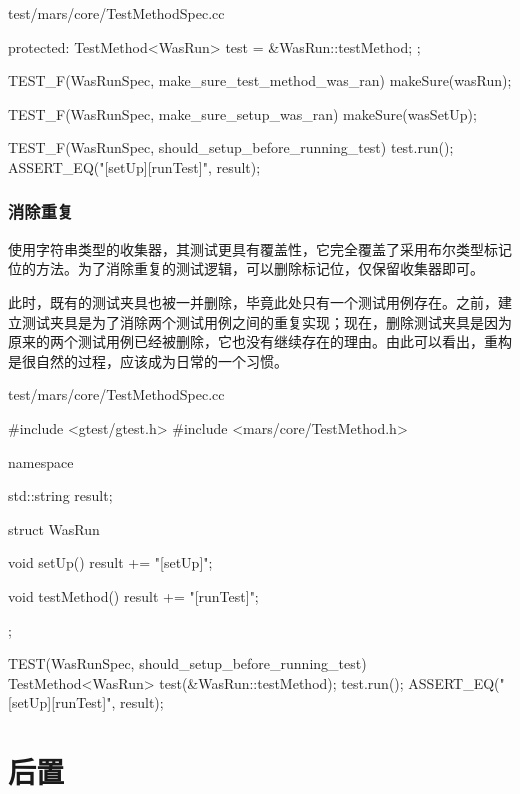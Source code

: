 \begin{content}
\begin{nodiff}{test/mars/core/TestMethodSpec.cc}
\begin{c++}
{{  protected:
    TestMethod<WasRun> test = &WasRun::testMethod;
  };
}

TEST_F(WasRunSpec, make_sure_test_method_was_ran) {
  makeSure(wasRun);
}

TEST_F(WasRunSpec, make_sure_setup_was_ran) {
  makeSure(wasSetUp);
}

TEST_F(WasRunSpec, should_setup_before_running_test) {
  test.run();
  ASSERT_EQ("[setUp][runTest]", result);
}
\end{c++}
\end{nodiff}

\subsubsection{消除重复}

使用字符串类型的收集器，其测试更具有覆盖性，它完全覆盖了采用布尔类型标记位的方法。为了消除重复的测试逻辑，可以删除标记位，仅保留收集器即可。

此时，既有的测试夹具也被一并删除，毕竟此处只有一个测试用例存在。之前，建立测试夹具是为了消除两个测试用例之间的重复实现；现在，删除测试夹具是因为原来的两个测试用例已经被删除，它也没有继续存在的理由。由此可以看出，重构是很自然的过程，应该成为日常的一个习惯。

\begin{nodiff}{test/mars/core/TestMethodSpec.cc}
\begin{c++}
#include <gtest/gtest.h>
#include <mars/core/TestMethod.h>

namespace {
  std::string result;

  struct WasRun {
    void setUp() {
      result += "[setUp]";
    }

    void testMethod() {
      result += "[runTest]";
    }
  };
}

TEST(WasRunSpec, should_setup_before_running_test) {
  TestMethod<WasRun> test(&WasRun::testMethod);
  test.run();
  ASSERT_EQ("[setUp][runTest]", result);
}
\end{c++}
\end{nodiff}

\end{content}

\section{后置}

